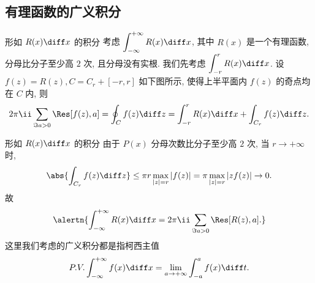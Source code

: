 \subsection{有理函数的广义积分}

\begin{frame}{形如 $R(x)\diff x$ 的积分\noexer}
	\onslide<+->
	考虑 $\displaystyle\int_{-\infty}^{+\infty}R(x)\diff x$, 其中 $R(x)$ 是一个有理函数, 分母比分子至少高 $2$ 次, 且分母没有实根.
	\onslide<+->
	我们先考虑 $\displaystyle\int_{-r}^rR(x)\diff x$.
	\onslide<+->
	设 $f(z)=R(z),C=C_r+[-r,r]$ 如下图所示, 使得上半平面内 $f(z)$ 的奇点均在 $C$ 内,
	\onslide<+->
	则
	\[2\pi\ii\sum_{\Im a>0}\Res[f(z),a]=\oint_Cf(z)\diff z=\int_{-r}^rR(x)\diff x+\int_{C_r}f(z)\diff z.
	\]
	\onslide<3->
	\begin{center}
	\end{center}
\end{frame}


\begin{frame}{形如 $R(x)\diff x$ 的积分\noexer}
	\onslide<+->
	由于 $P(x)$ 分母次数比分子至少高 $2$ 次,
	\onslide<+->
	当 $r\to+\infty$ 时,
	\[\abs{\int_{C_r}f(z)\diff z}\le \pi r\max_{|z|=r}|f(z)|
	=\pi \max_{|z|=r}|zf(z)|\to 0.
	\]
	\onslide<+->
	故
	\[\alertn{\int_{-\infty}^{+\infty}R(x)\diff x=2\pi\ii\sum_{\Im a>0}\Res[R(z),a].}
	\]
	\onslide<+->
	这里我们考虑的广义积分都是指柯西主值
	\[P.V.\int_{-\infty}^{+\infty}f(x)\diff x=\lim_{a\to+\infty}\int_{-a}^af(x)\diff t.
	\]
\end{frame}


